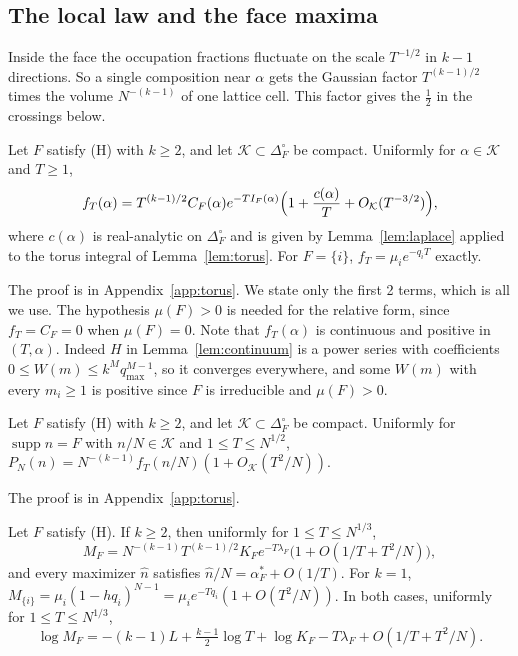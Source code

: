 \subsection{The local law and the face maxima}

Inside the face the occupation fractions fluctuate on the scale $T^{-1/2}$ in
$k-1$ directions. So a single composition near $\alpha$ gets the Gaussian
factor $T^{(k-1)/2}$ times the volume $N^{-(k-1)}$ of one lattice cell. This
factor gives the $\frac12$ in the crossings below.

\begin{theorem}\label{thm:local}
Let $F$ satisfy (H) with $k\ge2$, and let $\mathcal K\subset\Delta_F^\circ$ be
compact. Uniformly for $\alpha\in\mathcal K$ and $T\ge1$,
\[
f_T(\alpha)=T^{(k-1)/2}C_F(\alpha)e^{-TI_F(\alpha)}
\Bigl(1+\frac{c(\alpha)}T+O_{\mathcal K}(T^{-3/2})\Bigr),
\]
where $c(\alpha)$ is real-analytic on $\Delta_F^\circ$ and is given by
Lemma~\ref{lem:laplace} applied to the torus integral of
Lemma~\ref{lem:torus}. For $F=\{i\}$, $f_T=\mu_ie^{-q_iT}$ exactly.
\end{theorem}

The proof is in Appendix~\ref{app:torus}. We state only the first 2 terms,
which is all we use. The hypothesis $\mu(F)>0$ is needed for the relative
form, since $f_T=C_F=0$ when $\mu(F)=0$. Note that $f_T(\alpha)$ is continuous
and positive in $(T,\alpha)$. Indeed $H$ in Lemma~\ref{lem:continuum} is a
power series with coefficients $0\le W(m)\le k^Mq_{\max}^{M-1}$, so it
converges everywhere, and some $W(m)$ with every $m_i\ge1$ is positive since
$F$ is irreducible and $\mu(F)>0$.

\begin{lemma}\label{lem:discrete}
Let $F$ satisfy (H) with $k\ge2$, and let $\mathcal K\subset\Delta_F^\circ$ be
compact. Uniformly for $\operatorname{supp}n=F$ with $n/N\in\mathcal K$ and
$1\le T\le N^{1/2}$,
$P_N(n)=N^{-(k-1)}f_T(n/N)(1+O_{\mathcal K}(T^2/N))$.
\end{lemma}

The proof is in Appendix~\ref{app:torus}.

\begin{theorem}\label{thm:facemax}
Let $F$ satisfy (H). If $k\ge2$, then uniformly for $1\le T\le N^{1/3}$,
\[
M_F=N^{-(k-1)}T^{(k-1)/2}K_Fe^{-T\lambda_F}\bigl(1+O(1/T+T^2/N)\bigr),
\]
and every maximizer $\hat n$ satisfies $\hat n/N=\alpha^*_F+O(1/T)$. For $k=1$,
$M_{\{i\}}=\mu_i(1-hq_i)^{N-1}=\mu_ie^{-Tq_i}(1+O(T^2/N))$. In both cases,
uniformly for $1\le T\le N^{1/3}$,
\begin{equation}\label{eq:logmax}
\log M_F=-(k-1)L+\tfrac{k-1}2\log T+\log K_F-T\lambda_F+O(1/T+T^2/N).
\end{equation}
\end{theorem}

